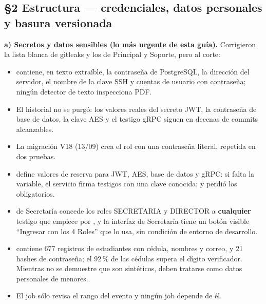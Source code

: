 \subsection*{\S2 Estructura --- credenciales, datos personales y basura versionada}
\textbf{a) Secretos y datos sensibles (lo m\'as urgente de esta gu\'ia).} Corrigieron la lista blanca de gitleaks y los  de Principal y Soporte, pero al corte:
\begin{itemize}[leftmargin=1.2em,itemsep=1pt,topsep=2pt]
\item {} contiene, en texto extra\'ible, la contrase\~na de PostgreSQL, la direcci\'on del servidor, el nombre de la clave SSH y cuentas de usuario con contrase\~na; ning\'un detector de texto inspecciona PDF.
\item El historial no se purg\'o: los valores reales del secreto JWT, la contrase\~na de base de datos, la clave AES y el testigo gRPC siguen en decenas de commits alcanzables.
\item La migraci\'on V18 (13/09) crea el rol  con una contrase\~na literal, repetida en dos pruebas.
\item {} define valores de reserva para JWT, AES, base de datos y gRPC: si falta la variable, el servicio firma testigos con una clave conocida; y  perdi\'o los  obligatorios.
\item {} de Secretar\'ia concede los roles SECRETARIA y DIRECTOR a \textbf{cualquier} testigo que empiece por , y la interfaz de Secretar\'ia tiene un bot\'on visible ``Ingresar con los 4 Roles'' que lo usa, sin condici\'on de entorno de desarrollo.
\item {} contiene 677 registros de estudiantes con c\'edula, nombres y correo, y 21 hashes de contrase\~na; el 92\,\% de las c\'edulas supera el d\'igito verificador. Mientras no se demuestre que son sint\'eticos, deben tratarse como datos personales de menores.
\item El job  s\'olo revisa el rango del evento y ning\'un job depende de \'el.
\end{itemize}
